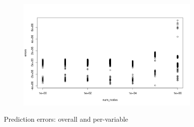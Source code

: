 \documentclass{article}
\begin{document}
\begin{figure}
\begin{subfigure}{0.49\textwidth}
  \end{subfigure}
   \begin{subfigure}{0.49\textwidth}
    \centering
    \includegraphics[width=\textwidth]{../io_local_tests/errors_per_variable.png}
  \end{subfigure}
  \caption{Prediction errors: overall and per-variable}
\end{figure}



\end{document}
